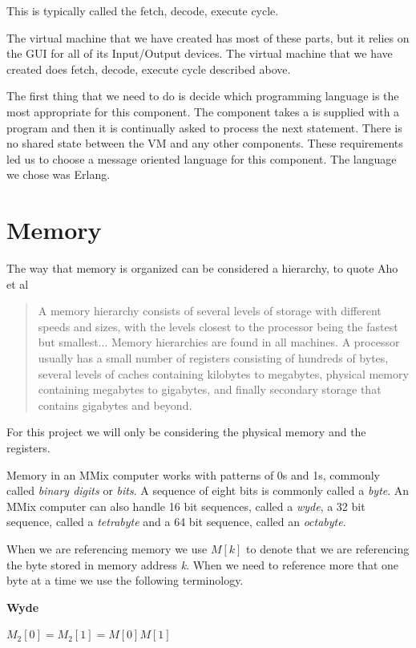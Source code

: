 \documentclass[a4paper,11pt]{report}
\begin{document}
This is typically called the fetch, decode, execute cycle.

The virtual machine that we have created has most of these parts, but it relies on the GUI for all of its Input/Output devices. The virtual machine that we have created does fetch, decode, execute cycle described above.

The first thing that we need to do is decide which programming language is the most appropriate for this component. The component takes a is supplied with a program and then it is continually asked to process the next statement. There is no shared state between the VM and any other components. These requirements led us to choose a message oriented language for this component. The language we chose was Erlang.
\section{Memory}
The way that memory is organized can be considered a hierarchy, to quote Aho et al\cite{dragon}
\begin{quotation}
A memory hierarchy consists of several levels of storage with different speeds and sizes, with the levels closest to the processor being the fastest but smallest... Memory hierarchies are found in all machines. A processor usually has a small number of registers consisting of hundreds of bytes, several levels of caches containing kilobytes to megabytes, physical memory containing megabytes to gigabytes, and finally secondary storage that contains gigabytes and beyond.
\end{quotation}
For this project we will only be considering the physical memory and the registers.

Memory in an MMix computer works with patterns of 0s and 1s, commonly called \textit{binary digits} or \textit{bits}. A sequence of eight bits is commonly called a \textit{byte}. An MMix computer can also handle 16 bit sequences, called a \textit{wyde}, a 32 bit sequence, called a \textit{tetrabyte} and a 64 bit sequence, called an \textit{octabyte}.

When we are referencing memory we use \begin{math}M[k]\end{math} to denote that we are referencing the byte stored in memory address \textit{k}. When we need to reference more that one byte at a time we use the following terminology.

\textbf{Wyde}

\begin{math}
M_2[0] = M_2[1] = M[0]M[1]
\end{math}
\end{document}
